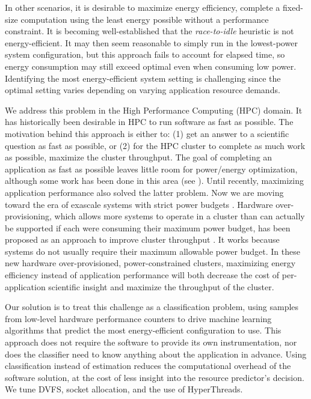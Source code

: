 In other scenarios, it is desirable to maximize energy efficiency, \ie complete a fixed-size computation using the least energy possible without a performance constraint.
It is becoming well-established that the \emph{race-to-idle} heuristic is not energy-efficient.
It may then seem reasonable to simply run in the lowest-power system configuration, but this approach fails to account for elapsed time, so energy consumption may still exceed optimal even when consuming low power.
Identifying the most energy-efficient system setting is challenging since the optimal setting varies depending on varying application resource demands.

We address this problem in the High Performance Computing (HPC) domain.
It has historically been desirable in HPC to run software as fast as possible.
The motivation behind this approach is either to: (1) get an answer to a scientific question as fast as possible, or (2) for the HPC cluster to complete as much work as possible, \ie maximize the cluster throughput.
The goal of completing an application as fast as possible leaves little room for power/energy optimization, although some work has been done in this area (see ).
Until recently, maximizing application performance also solved the latter problem.
Now we are moving toward the era of exascale systems with strict power budgets \cite{Exascale20MW}.
Hardware over-provisioning, which allows more systems to operate in a cluster than can actually be supported if each were consuming their maximum power budget, has been proposed as an approach to improve cluster throughput \cite{PatkiRMAP}.
It works because systems do not usually require their maximum allowable power budget.
In these new hardware over-provisioned, power-constrained clusters, maximizing energy efficiency instead of application performance will both decrease the cost of per-application scientific insight and maximize the throughput of the cluster.

Our solution is to treat this challenge as a classification problem, using samples from low-level hardware performance counters to drive machine learning algorithms that predict the most energy-efficient configuration to use.
This approach does not require the software to provide its own instrumentation, nor does the classifier need to know anything about the application in advance.
Using classification instead of estimation reduces the computational overhead of the software solution, at the cost of less insight into the resource predictor's decision.
We tune DVFS, socket allocation, and the use of HyperThreads.

